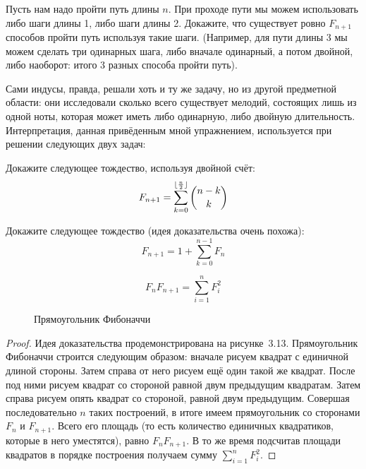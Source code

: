\begin{exercise}
Пусть нам надо пройти путь длины $n$. При проходе пути мы можем использовать либо шаги длины 1, либо шаги длины 2. Докажите, что существует ровно $F_{n+1}$ способов пройти путь используя такие шаги. (Например, для пути длины 3 мы можем сделать три одинарных шага, либо вначале одинарный, а потом двойной, либо наоборот: итого 3 разных способа пройти путь).
\end{exercise}

Сами индусы, правда, решали хоть и ту же задачу, но из другой предметной области: они исследовали сколько всего существует мелодий, состоящих лишь из одной ноты, которая может иметь либо одинарную, либо двойную длительность. Интерпретация, данная привёденным мной упражнением, используется при решении следующих двух задач:

\begin{exercise}
Докажите следующее тождество, используя двойной счёт:
$$F_{n+1} = \sum_{k=0}^{\lfloor {n\over 2}\rfloor} {n-k\choose k}$$
\end{exercise}

\begin{exercise}
Докажите следующее тождество (идея доказательства очень похожа):
$$F_{n+1} = 1+ \sum_{k=0}^{n-1}F_n$$
\end{exercise}

\begin{thm}
$$F_n F_{n+1} = \sum_{i=1}^n F_i^2$$
\end{thm}
\begin{figure}[h]
\centering
{}
\caption{Прямоугольник Фибоначчи}
\end{figure}
\begin{proof}
Идея доказательства продемонстрирована на рисунке~3.13. Прямоугольник Фибоначчи строится следующим образом: вначале рисуем квадрат с единичной длиной стороны. Затем справа от него рисуем ещё один такой же квадрат. После под ними рисуем квадрат со стороной равной двум предыдущим квадратам. Затем справа рисуем опять квадрат со стороной, равной двум предыдущим. Совершая последовательно $n$ таких построений, в итоге имеем прямоугольник со сторонами $F_n$ и $F_{n+1}$. Всего его площадь (то есть количество единичных квадратиков, которые в него уместятся), равно $F_nF_{n+1}$. В то же время подсчитав площади квадратов в порядке построения получаем сумму  $\sum_{i=1}^n F_i^2$.
\end{proof}

